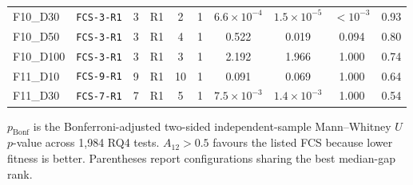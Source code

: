 \begin{table}[H]
\begin{tabular}{llcccccccc}
F10\_D30 & \texttt{FCS-3-R1} & 3 & R1 & 2 & 1 & $6.6\!\times10^{-4}$ & $1.5\!\times10^{-5}$ & $<10^{-3}$ & 0.93 \\
F10\_D50 & \texttt{FCS-3-R1} & 3 & R1 & 4 & 1 & 0.522 & 0.019 & 0.094 & 0.80 \\
F10\_D100 & \texttt{FCS-3-R1} & 3 & R1 & 3 & 1 & 2.192 & 1.966 & 1.000 & 0.74 \\
F11\_D10 & \texttt{FCS-9-R1} & 9 & R1 & 10 & 1 & 0.091 & 0.069 & 1.000 & 0.64 \\
F11\_D30 & \texttt{FCS-7-R1} & 7 & R1 & 5 & 1 & $7.5\!\times10^{-3}$ & $1.4\!\times10^{-3}$ & 1.000 & 0.54 \\
\bottomrule
\end{tabular}
\par\smallskip
{\raggedright\footnotesize
$p_{\mathrm{Bonf}}$ is the Bonferroni-adjusted two-sided independent-sample Mann--Whitney $U$ $p$-value across 1,984 RQ4 tests. $A_{12}>0.5$ favours the listed FCS because lower fitness is better. Parentheses report configurations sharing the best median-gap rank.\par}
\end{table}

